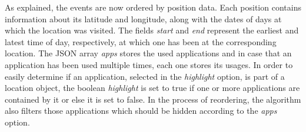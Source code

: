As  explained, the events are now ordered by position data. Each position contains information about its latitude and longitude, along with the dates of days at which the location was visited. The fields \emph{start} and \emph{end} represent the earliest and latest time of day, respectively, at which one has been at the corresponding location. The JSON array \emph{apps} stores the used applications and in case that an application has been used multiple times, each one stores its usages. In order to easily determine if an application, selected in the \emph{highlight} option, is part of a location object, the boolean \emph{highlight} is set to true if one or more applications are contained by it or else it is set to false. In the process of reordering, the algorithm also filters those applications which should be hidden according to the \emph{apps} option.

